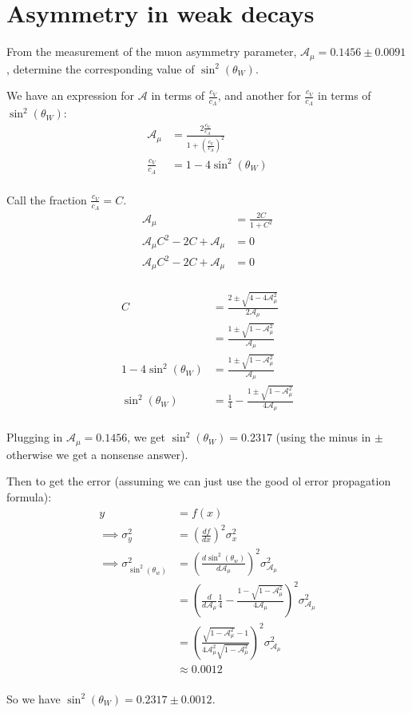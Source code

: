 \section{Asymmetry in weak decays}

From the measurement of the muon asymmetry parameter, $\mathcal{A}_\mu = 0.1456\pm 0.0091$, determine the corresponding value of $\sin^2(\theta_W)$.

We have an expression for $\mathcal{A}$ in terms of $\frac{c_V}{c_A}$, and another for $\frac{c_V}{c_A}$ in terms of $\sin^2(\theta_W)$:
\begin{align*}
    \mathcal{A}_\mu &= \frac{2\frac{c_V}{c_A}}{1 + \left(\frac{c_V}{c_A}\right)^2} \\
    \frac{c_V}{c_A} &= 1 - 4\sin^2(\theta_W) \\
\end{align*}

Call the fraction $\frac{c_V}{c_A} = C$.
\begin{align*}
    \mathcal{A}_\mu &= \frac{2C}{1 + C^2} \\
    \mathcal{A}_\mu C^2 - 2C + \mathcal{A}_\mu &= 0 \\
    \mathcal{A}_\mu C^2 - 2C + \mathcal{A}_\mu &= 0 \\
\end{align*}

\begin{align*}
    C &= \frac{2 \pm \sqrt{4 - 4\mathcal{A}_\mu^2}}{2\mathcal{A}_\mu} \\
    &= \frac{1 \pm \sqrt{1 - \mathcal{A}_\mu^2}}{\mathcal{A}_\mu} \\
    1 - 4\sin^2(\theta_W) &= \frac{1 \pm \sqrt{1 - \mathcal{A}_\mu^2}}{\mathcal{A}_\mu} \\
    \sin^2(\theta_W) &= \frac{1}{4} - \frac{1 \pm \sqrt{1 - \mathcal{A}_\mu^2}}{4\mathcal{A}_\mu} \\
\end{align*}

Plugging in $\mathcal{A}_\mu = 0.1456$, we get $\sin^2(\theta_W) = 0.2317$ (using the minus in $\pm$ otherwise we get a nonsense answer).

Then to get the error (assuming we can just use the good ol error propagation formula):
\begin{align*}
    y &= f(x) \\
    \implies \sigma_y^2 &= \left(\frac{d f}{d x}\right)^2 \sigma_x^2 \\
    \implies \sigma_{\sin^2(\theta_w)}^2 &= \left(\frac{d \sin^2(\theta_w)}{d \mathcal{A}_\mu}\right)^2 \sigma_{\mathcal{A}_\mu}^2 \\
    &= \left(\frac{d}{d \mathcal{A}_\mu} \frac{1}{4} - \frac{1 - \sqrt{1 - \mathcal{A}_\mu^2}}{4\mathcal{A}_\mu}\right)^2 \sigma_{\mathcal{A}_\mu}^2 \\
    &= \left(\frac{\sqrt{1 - \mathcal{A}_\mu^2} - 1}{4\mathcal{A}_\mu^2\sqrt{1 - \mathcal{A}_\mu^2}}\right)^2 \sigma_{\mathcal{A}_\mu}^2 \\
    &\approx 0.0012 \\
\end{align*}

So we have $\sin^2(\theta_W) = 0.2317 \pm 0.0012$.